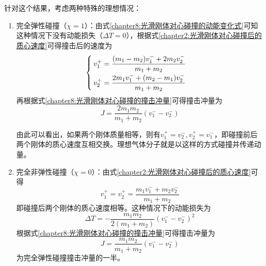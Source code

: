 针对这个结果，考虑两种特殊的理想情况：
\begin{enumerate}
\item 完全弹性碰撞（$\chi=1$）：由式\eqref{chapter8:光滑刚体对心碰撞的动能变化式}可知这种情况下没有动能损失（$\Delta T=0$），根据式\eqref{chapter2:光滑刚体对心碰撞后的质心速度}可得撞击后的速度为
\begin{equation}
\begin{cases}
	\displaystyle v_1^+ = \frac{(m_1-m_2)v_1^-+2m_2v_2^-}{m_1+m_2} \\[1.5ex]
	\displaystyle v_2^+ = \frac{2m_1v_1^-+(m_2-m_1)v_2^-}{m_1+m_2}
\end{cases}
\end{equation}
再根据式\eqref{chapter8:光滑刚体对心碰撞的撞击冲量}可得撞击冲量为
\begin{equation}
	J = \frac{2m_1m_2}{m_1+m_2}(v_1^--v_2^-)
\end{equation}

由此可以看出，如果两个刚体质量相等，则有$v_1^+=v_2^-, v_2^+=v_1^-$，即碰撞前后两个刚体的质心速度互相交换。理想气体分子就是以这样的方式碰撞并传递动量。

\item 完全非弹性碰撞（$\chi=0$）：由式\eqref{chapter2:光滑刚体对心碰撞后的质心速度}可得
\begin{equation}
	v_1^+=v_2^+ =\frac{m_1v_1^-+m_2v_2^-}{m_1+m_2}
\end{equation}
即碰撞后两个刚体的质心速度相等。这种情况下的动能损失为
\begin{equation}
	\Delta T = -\frac{m_1m_2}{2(m_1+m_2)}(v_1^--v_2^-)^2
\end{equation}
根据式\eqref{chapter8:光滑刚体对心碰撞的撞击冲量}可得撞击冲量为
\begin{equation}
	J = \frac{m_1m_2}{m_1+m_2}(v_1^--v_2^-)
\end{equation}
为完全弹性碰撞撞击冲量的一半。
\end{enumerate}
